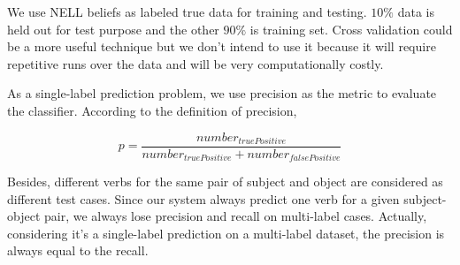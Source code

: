 We use NELL beliefs as labeled true data for training and testing. $10\%$ data is held out for test purpose and the other $90\%$ is training set. Cross validation could be a more useful technique but we don't intend to use it because it will require repetitive runs over the data and will be very computationally costly.

As a single-label prediction problem, we use precision as the metric to evaluate the classifier. According to the definition of precision,

\begin{equation}
	p = \frac{number_{truePositive}}{number_{truePositive} + number_{falsePositive}}
\end{equation}

Besides, different verbs for the same pair of subject and object are considered as different test cases. Since our system always predict one verb for a given subject-object pair, we always lose precision and recall on multi-label cases. Actually, considering it's a single-label prediction on a multi-label dataset, the precision is always equal to the recall.




